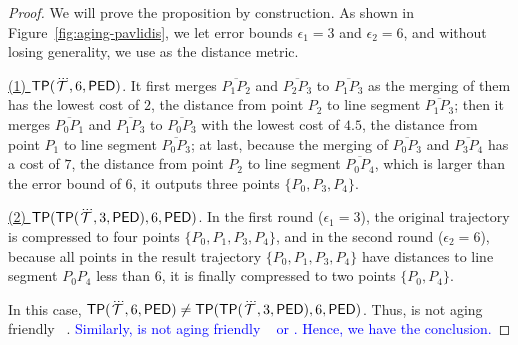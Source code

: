 \begin{proof}
We will prove the proposition by construction.
As shown in Figure~\ref{fig:aging-pavlidis}, we let error bounds $\epsilon_1 =3$ and $\epsilon_2=6$, and without losing generality, we use \ped as the distance metric.

\underline{(1) ${{\mathsf{TP}}}(\dddot{\mathcal{T}}, 6, {\mathsf{PED}})$}. It first merges $\overline{P_1P_2}$ and $\overline{P_2P_3}$ to $\overline{P_1P_3}$ as the merging of them has the lowest cost of $2$, the distance from point $P_2$ to line segment $\overline{P_1P_3}$; then it merges $\overline{P_0P_1}$ and $\overline{P_1P_3}$ to $\overline{P_0P_3}$ with the lowest cost of $4.5$, the distance from point $P_1$ to line segment $\overline{P_0P_3}$; at last, because the merging of $\overline{P_0P_3}$ and $\overline{P_3P_4}$ has a cost of $7$, the distance from point $P_2$ to line segment $\overline{P_0P_4}$, which is larger than the error bound of $6$, it outputs three points $\{P_0, P_3, P_4\}$.

\underline{(2) ${{\mathsf{TP}}}({\mathsf{TP}}(\dddot{\mathcal{T}}, 3, {\mathsf{PED}}), 6, {\mathsf{PED}})$}. In the first round ($\epsilon_1=3$), the original trajectory is compressed to four points $\{P_0, P_1, P_3, P_4\}$, and in the second round ($\epsilon_2=6$), because all points in the result trajectory $\{P_0, P_1, P_3, P_4\}$ have distances to line segment $P_0P_4$ less than $6$, it is finally compressed to two points $\{P_0, P_4\}$.

In this case, ${{\mathsf{TP}}}(\dddot{\mathcal{T}}, 6, {\mathsf{PED}}) \ne {{\ensuremath {\mathsf{TP}}}}({\mathsf{TP}}(\dddot{\mathcal{T}}, 3, {\mathsf{PED}}), 6, {\mathsf{PED}})$. Thus, \tpa is not aging friendly \wrt~\ped.
\textcolor{blue}{Similarly, \tpa is not aging friendly \wrt~ \sed or \dad. Hence, we have the conclusion.}
\end{proof}


	
